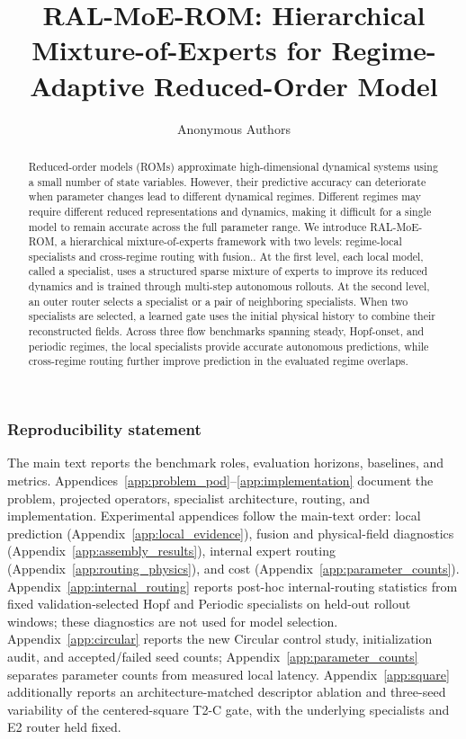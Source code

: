 \documentclass{article}
\title{RAL-MoE-ROM: Hierarchical Mixture-of-Experts for Regime-Adaptive Reduced-Order Model }
\author{Anonymous Authors}
\begin{document}
\raggedbottom

\maketitle

\begin{abstract}
Reduced-order models (ROMs) approximate high-dimensional dynamical systems using a small number of state variables. However, their predictive accuracy can deteriorate when parameter changes lead to different dynamical regimes. Different regimes may require different reduced representations and dynamics, making it difficult for a single model to remain accurate across the full parameter range. We introduce RAL-MoE-ROM, a hierarchical mixture-of-experts framework with two levels: regime-local specialists and cross-regime routing with fusion.. At the first level, each local model, called a specialist, uses a structured sparse mixture of experts to improve its reduced dynamics and is trained through multi-step autonomous rollouts. At the second level, an outer router selects a specialist or a pair of neighboring specialists. When two specialists are selected, a learned gate uses the initial physical history to combine their reconstructed fields. Across three flow benchmarks spanning steady, Hopf-onset, and periodic regimes, the local specialists provide accurate autonomous predictions, while cross-regime routing further improve prediction in the evaluated regime overlaps.
\end{abstract}





\FloatBarrier


\subsubsection*{Reproducibility statement}
The main text reports the benchmark roles, evaluation horizons, baselines, and metrics. Appendices~\ref{app:problem_pod}--\ref{app:implementation} document the problem, projected operators, specialist architecture, routing, and implementation. Experimental appendices follow the main-text order: local prediction (Appendix~\ref{app:local_evidence}), fusion and physical-field diagnostics (Appendix~\ref{app:assembly_results}), internal expert routing (Appendix~\ref{app:routing_physics}), and cost (Appendix~\ref{app:parameter_counts}).
Appendix~\ref{app:internal_routing} reports post-hoc internal-routing statistics
from fixed validation-selected Hopf and Periodic specialists on held-out
rollout windows; these diagnostics are not used for model selection.
Appendix~\ref{app:circular} reports the new Circular control study, initialization audit, and accepted/failed seed counts; Appendix~\ref{app:parameter_counts} separates parameter counts from measured local latency.
Appendix~\ref{app:square} additionally reports an architecture-matched descriptor
ablation and three-seed variability of the centered-square T2-C gate, with the
underlying specialists and E2 router held fixed.
\end{document}
